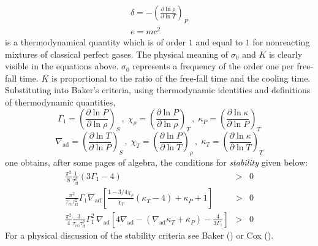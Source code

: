 \documentclass{layout}
\begin{document}
   \begin{equation}
   \begin{array}{l}
      \delta = - \left(
                    \frac{ \partial \ln \rho }{ \partial \ln T }
                 \right)_P \\
      e=mc^2
   \end{array}
   \end{equation}
   is a thermodynamical quantity which is of order $1$ and equal to $1$
   for nonreacting mixtures of classical perfect gases. The physical
   meaning of $ \sigma_0 $ and $K$ is clearly visible in the equations
   above. $\sigma_0$ represents a frequency of the order one per
   free-fall time. $K$ is proportional to the ratio of the free-fall
   time and the cooling time. Substituting into Baker's criteria, using
   thermodynamic identities and definitions of thermodynamic quantities,
   \begin{displaymath}
      \Gamma_1      = \left( \frac{ \partial \ln P}{ \partial\ln \rho}
                           \right)_{S}    \, , \;
      \chi^{}_\rho  = \left( \frac{ \partial \ln P}{ \partial\ln \rho}
                           \right)_{T}    \, , \;
      \kappa^{}_{P} = \left( \frac{ \partial \ln \kappa}{ \partial\ln P}
                           \right)_{T}
   \end{displaymath}
   \begin{displaymath}
      \nabla_{\mathrm{ad}} = \left( \frac{ \partial \ln T}
                             { \partial\ln P} \right)_{S} \, , \;
      \chi^{}_T       = \left( \frac{ \partial \ln P}
                             { \partial\ln T} \right)_{\rho} \, , \;
      \kappa^{}_{T}   = \left( \frac{ \partial \ln \kappa}
                             { \partial\ln T} \right)_{T}
   \end{displaymath}
   one obtains, after some pages of algebra, the conditions for
   \emph{stability\/} given
   below:
   \begin{eqnarray}
      \frac{\pi^2}{8} \frac{1}{\tau_{\mathrm{ff}}^2}
                ( 3 \Gamma_1 - 4 )
         & > & 0 \label{ZSDynSta} \\
      \frac{\pi^2}{\tau_{\mathrm{co}}
                   \tau_{\mathrm{ff}}^2}
                   \Gamma_1 \nabla_{\mathrm{ad}}
                   \left[ \frac{ 1- 3/4 \chi^{}_\rho }{ \chi^{}_T }
                          ( \kappa^{}_T - 4 )
                        + \kappa^{}_P + 1
                   \right]
        & > & 0 \label{ZSSecSta} \\
     \frac{\pi^2}{4} \frac{3}{\tau_{ \mathrm{co} }
                              \tau_{ \mathrm{ff} }^2
                             }
         \Gamma_1^2 \, \nabla_{\mathrm{ad}} \left[
                                   4 \nabla_{\mathrm{ad}}
                                   - ( \nabla_{\mathrm{ad}} \kappa^{}_T
                                     + \kappa^{}_P
                                     )
                                   - \frac{4}{3 \Gamma_1}
                                \right]
        & > & 0   \label{ZSVibSta}
   \end{eqnarray}
%
   For a physical discussion of the stability criteria see Baker
   (\cite{baker}) or Cox (\cite{cox}).
\end{document}
